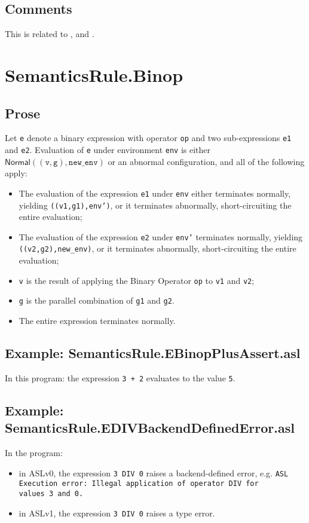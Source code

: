 \documentclass{book}
\newcommand\Normal[0]{\textsf{Normal}}
\newcommand\newenv[0]{\texttt{new\_env}}
\newcommand\vg[0]{\texttt{g}}
\newcommand\vv[0]{\texttt{v}}
\begin{document}
\subsection{Comments}
  This is related to , and .

\section{SemanticsRule.Binop \label{sec:SemanticsRule.Binop}}

  \subsection{Prose}
  Let \texttt{e} denote a binary expression with operator \texttt{op} and two sub-expressions \texttt{e1} and \texttt{e2}.
  Evaluation of \texttt{e} under environment \texttt{env} is either $\Normal((\vv, \vg), \newenv)$
  or an abnormal configuration, and all of the following apply:
  \begin{itemize}
    \item The evaluation of the expression \texttt{e1} under \texttt{env} either terminates normally,
    yielding \texttt{((v1,g1),env')}, or it terminates abnormally, short-circuiting the entire evaluation;
    \item The evaluation of the expression \texttt{e2} under \texttt{env'} terminates normally,
    yielding \texttt{((v2,g2),new\_env)}, or it terminates abnormally, short-circuiting the entire evaluation;
    \item \texttt{v} is the result of applying the Binary Operator \texttt{op} to \texttt{v1} and \texttt{v2};
    \item \texttt{g} is the parallel combination of \texttt{g1} and \texttt{g2}.
    \item The entire expression terminates normally.
  \end{itemize}

  \subsection{Example: SemanticsRule.EBinopPlusAssert.asl}
    In this program:
    the expression \texttt{3 + 2} evaluates to the value \texttt{5}.

  \subsection{Example: \\ SemanticsRule.EDIVBackendDefinedError.asl}
    In the program:
    \begin{itemize}
    \item in ASLv0, the expression \texttt{3 DIV 0} raises a backend-defined
      error, e.g.
      \texttt{ASL Execution error: Illegal application of operator DIV for \\ values 3 and 0.}
    \item in ASLv1, the expression \texttt{3 DIV 0} raises a type error.
    \end{itemize}
\end{document}
